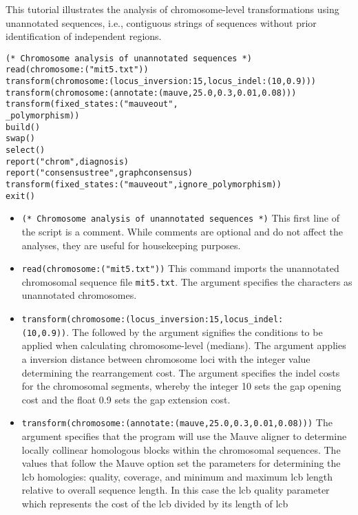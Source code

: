 This tutorial illustrates the analysis of chromosome-level transformations using 
unannotated sequences, i.e., contiguous strings of sequences without prior 
identification of independent regions. 

\begin{verbatim}
(* Chromosome analysis of unannotated sequences *)
read(chromosome:("mit5.txt"))
transform(chromosome:(locus_inversion:15,locus_indel:(10,0.9)))
transform(chromosome:(annotate:(mauve,25.0,0.3,0.01,0.08)))
transform(fixed_states:("mauveout",
_polymorphism))
build()
swap()
select()
report("chrom",diagnosis)
report("consensustree",graphconsensus)
transform(fixed_states:("mauveout",ignore_polymorphism))
exit()
\end{verbatim}

\begin{itemize}
\item \texttt{(* Chromosome analysis of unannotated sequences *)} This first line of the script is a comment. While 
comments are optional and do not affect the analyses, they are useful for housekeeping purposes.
\item \texttt{read(chromosome:("mit5.txt"))} This command imports the unannotated chromosomal sequence file 
\texttt{mit5.txt}. The argument  specifies the characters as unannotated chromosomes.
\item \texttt{transform(chromosome:(locus\_inversion:15,locus\_indel:\\(10,0.9))}.  The  
followed by the argument  signifies the conditions to be applied when calculating 
chromosome-level (medians).  The argument  applies a inversion distance 
between chromosome loci with the integer value determining the rearrangement cost. The argument 
 specifies the indel costs for the chromosomal segments, whereby the integer 10 
sets the gap opening cost and the float 0.9 sets the gap extension cost.
\item \texttt{transform(chromosome:(annotate:(mauve,25.0,0.3,0.01,0.08)))} The argument  specifies that the program will use the Mauve aligner \cite{darlingetal2004} to determine locally collinear 
homologous blocks within the chromosomal sequences.  The values that follow the Mauve option set the parameters 
for determining the lcb homologies: quality, coverage, and minimum and maximum lcb length relative to overall 
sequence length. In this case the lcb quality parameter which represents the cost of the lcb divided by its length of lcb 

\end{itemize}
